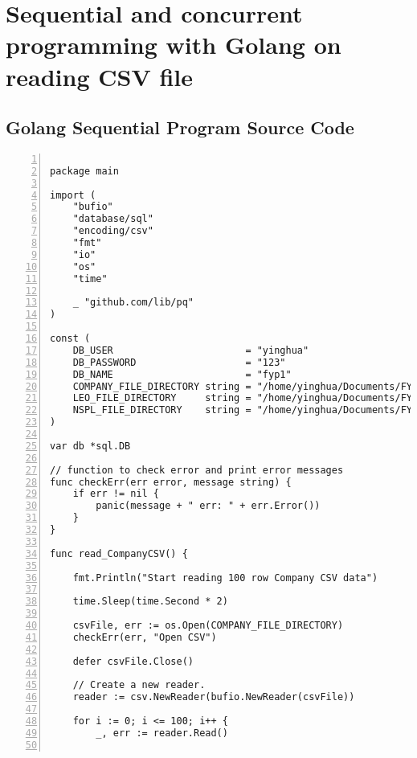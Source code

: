 \chapter{Sequential and concurrent programming with Golang on reading CSV file} 
\label{AppendixD} 


\section {Golang Sequential Program Source Code}

\lstset{basicstyle=\ttfamily\tiny}  
\begin{lstlisting}[breaklines, frame=single, numbers=left, caption={Golang Sequential Program Source Code}, label=commandline-02]

package main

import (
	"bufio"
	"database/sql"
	"encoding/csv"
	"fmt"
	"io"
	"os"
	"time"
	
	_ "github.com/lib/pq"
)

const (
	DB_USER                       = "yinghua"
	DB_PASSWORD                   = "123"
	DB_NAME                       = "fyp1"
	COMPANY_FILE_DIRECTORY string = "/home/yinghua/Documents/FYP-data/company-data/company-data-full.csv"
	LEO_FILE_DIRECTORY     string = "/home/yinghua/Documents/FYP-data/subject-data/institution-subject-data.csv"
	NSPL_FILE_DIRECTORY    string = "/home/yinghua/Documents/FYP-data/postcode-data/UK-NSPL.csv"
)

var db *sql.DB

// function to check error and print error messages
func checkErr(err error, message string) {
	if err != nil {
		panic(message + " err: " + err.Error())
	}
}

func read_CompanyCSV() {
	
	fmt.Println("Start reading 100 row Company CSV data")
	
	time.Sleep(time.Second * 2)
	
	csvFile, err := os.Open(COMPANY_FILE_DIRECTORY)
	checkErr(err, "Open CSV")
	
	defer csvFile.Close()
	
	// Create a new reader.
	reader := csv.NewReader(bufio.NewReader(csvFile))
	
	for i := 0; i <= 100; i++ {
		_, err := reader.Read()
		

\end{lstlisting}
